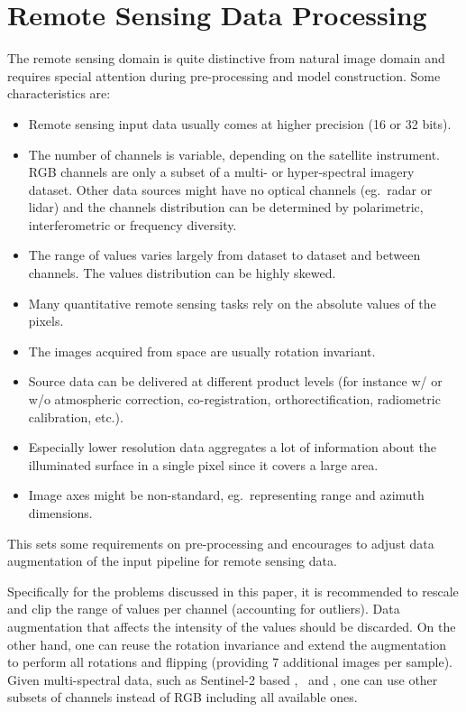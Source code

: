 \section{Remote Sensing Data Processing}
The remote sensing domain is quite distinctive from natural image domain and requires special attention during pre-processing and model construction. Some characteristics are:
\begin{itemize}
    \item Remote sensing input data usually comes at higher precision (16 or 32 bits).
    \item The number of channels is variable, depending on the satellite instrument. RGB channels are only a subset of a multi- or hyper-spectral imagery dataset. Other data sources might have no optical channels (eg.\ radar or lidar) and the channels distribution can be determined by polarimetric, interferometric or frequency diversity.
    \item The range of values varies largely from dataset to dataset and between channels. The values distribution can be highly skewed.
    \item Many quantitative remote sensing tasks rely on the absolute values of the pixels.
    \item The images acquired from space are usually rotation invariant. 
    \item Source data can be delivered at different product levels (for instance w/ or w/o atmospheric correction, co-registration, orthorectification, radiometric calibration, etc.). 
    \item Especially lower resolution data aggregates a lot of information about the illuminated surface in a single pixel since it covers a large area.
    \item Image axes might be non-standard, eg.\ representing range and azimuth dimensions.
\end{itemize}

This sets some requirements on pre-processing and encourages to adjust data augmentation of the input pipeline for remote sensing data.

Specifically for the problems discussed in this paper, it is recommended to rescale and clip the range of values per channel (accounting for outliers). Data augmentation that affects the intensity of the values should be discarded. On the other hand, one can reuse the rotation invariance and extend the augmentation to perform all rotations and flipping (providing 7 additional images per sample). Given multi-spectral data, such as Sentinel-2 based \ben{}, \eur{}\ and \sos{}, one can use other subsets of channels instead of RGB including all available ones.



